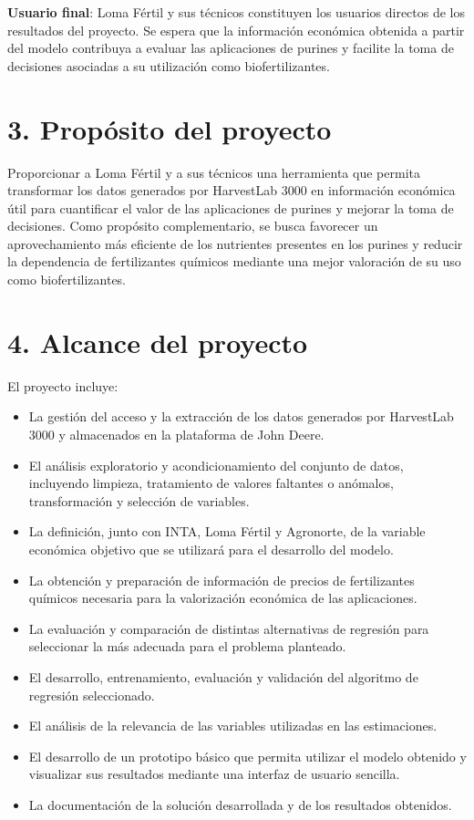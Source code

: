 \documentclass[
11pt, %
]{charter}
\begin{document}
\textbf{Usuario final}: Loma Fértil y sus técnicos constituyen los usuarios directos de los resultados del proyecto. Se espera que la información económica obtenida a partir del modelo contribuya a evaluar las aplicaciones de purines y facilite la toma de decisiones asociadas a su utilización como biofertilizantes.





\section{3. Propósito del proyecto}
\label{sec:proposito}

Proporcionar a Loma Fértil y a sus técnicos una herramienta que permita transformar los datos generados por HarvestLab 3000 en información económica útil para cuantificar el valor de las aplicaciones de purines y mejorar la toma de decisiones. Como propósito complementario, se busca favorecer un aprovechamiento más eficiente de los nutrientes presentes en los purines y reducir la dependencia de fertilizantes químicos mediante una mejor valoración de su uso como biofertilizantes.





\section{4. Alcance del proyecto}
\label{sec:alcance}

El proyecto incluye:

\begin{itemize}
\item La gestión del acceso y la extracción de los datos generados por HarvestLab 3000 y almacenados en la plataforma de John Deere.
\item El análisis exploratorio y acondicionamiento del conjunto de datos, incluyendo limpieza, tratamiento de valores faltantes o anómalos, transformación y selección de variables.
\item La definición, junto con INTA, Loma Fértil y Agronorte, de la variable económica objetivo que se utilizará para el desarrollo del modelo.
\item La obtención y preparación de información de precios de fertilizantes químicos necesaria para la valorización económica de las aplicaciones.
\item La evaluación y comparación de distintas alternativas de regresión para seleccionar la más adecuada para el problema planteado.
\item El desarrollo, entrenamiento, evaluación y validación del algoritmo de regresión seleccionado.
\item El análisis de la relevancia de las variables utilizadas en las estimaciones.
\item El desarrollo de un prototipo básico que permita utilizar el modelo obtenido y visualizar sus resultados mediante una interfaz de usuario sencilla.
\item La documentación de la solución desarrollada y de los resultados obtenidos.
\end{itemize}
\end{document}
